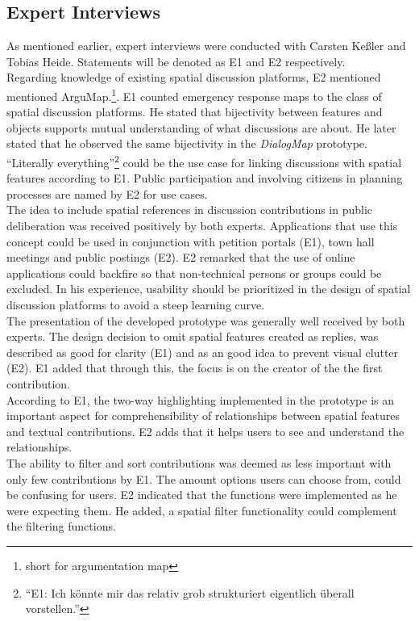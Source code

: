 \subsection{Expert Interviews}
\label{sub:ev_expert_interviews}
As mentioned earlier, expert interviews were conducted with Carsten Ke{\ss}ler and Tobias Heide. Statements will be denoted as E1 and E2 respectively.\\
Regarding knowledge of existing spatial discussion platforms, E2 mentioned mentioned ArguMap.\footnote{short for argumentation map}. E1 counted emergency response maps to the class of spatial discussion platforms. He stated that bijectivity between features and objects supports mutual understanding of what discussions are about. He later stated that he observed the same bijectivity in the \textit{DialogMap} prototype.\\
``Literally everything''\footnote{``E1: Ich k{\"o}nnte mir das relativ grob strukturiert eigentlich {\"u}berall vorstellen.''} could be the use case for linking discussions with spatial features according to E1. Public participation and involving citizens in planning processes are named by E2 for use cases.\\
The idea to include spatial references in discussion contributions in public deliberation was received positively by both experts. Applications that use this concept could be used in conjunction with petition portals (E1), town hall meetings and public postings (E2). E2 remarked that the use of online applications could backfire so that non-technical persons or groups could be excluded. In his experience, usability should be prioritized in the design of spatial discussion platforms to avoid a steep learning curve. \\
The presentation of the developed prototype was generally well received by both experts. The design decision to omit spatial features created as replies, was described as good for clarity (E1) and as an good idea to prevent visual clutter (E2). E1 added that through this, the focus is on the creator of the the first contribution.\\
According to E1, the two-way highlighting implemented in the prototype is an important aspect for comprehensibility of relationships between spatial features and textual contributions. E2 adds that it helps users to see and understand the relationships.\\
The ability to filter and sort contributions was deemed as less important with only few contributions by E1. The amount options users can choose from, could be confusing for users. E2 indicated that the functions were implemented as he were expecting them. He added, a spatial filter functionality could complement the filtering functions.\\
